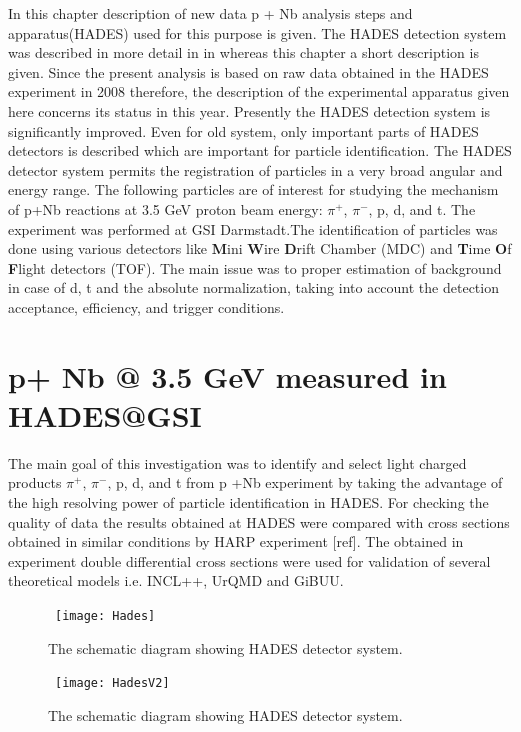 In this chapter description of new data p + Nb analysis steps and apparatus(HADES) used for this purpose is given. The HADES detection system was described in more detail in \cite{agakichiev2009HADES} in whereas this chapter a short description is given. Since the present analysis is based on raw data obtained in the HADES experiment in 2008 therefore, the description of the experimental apparatus given here concerns its status in this year.  Presently the HADES detection system is significantly improved. Even for old system, only important parts of HADES detectors is described which are important for particle identification. The HADES detector system permits the registration of particles in a very broad angular and energy range. The following particles are of interest for studying the mechanism of p+Nb reactions at 3.5 GeV proton beam energy: $\pi^+$, $\pi^-$, p, d, and t. The experiment was performed at GSI Darmstadt.The identification of particles was done using various detectors like \textbf{M}ini \textbf{W}ire \textbf{D}rift Chamber (MDC) and \textbf{T}ime \textbf{O}f \textbf{F}light detectors (TOF). The main issue was to proper estimation of background in case of d, t and the absolute normalization, taking into account the detection acceptance, efficiency, and trigger conditions.
\section{p+ Nb @ 3.5 GeV measured in HADES@GSI}
The main goal of this investigation was to identify and select light charged products $\pi^+$, $\pi^-$, p, d, and t from p +Nb experiment by taking the advantage of the high resolving power of particle identification in HADES. For checking the quality of data the results obtained at HADES were compared with cross sections obtained in similar conditions by HARP experiment [ref]. The obtained in experiment double differential cross sections were used for validation of several theoretical models i.e. INCL++, UrQMD and GiBUU.

\begin{figure}
	\centering\
	\texttt{[image: Hades]}
	\caption{The schematic diagram showing HADES detector system.}
	\label{Hades}
\end{figure}
\begin{figure}
	\centering\
	\texttt{[image: HadesV2]}
	\caption{The schematic diagram showing HADES detector system.}
	\label{HadesV2}
\end{figure}
